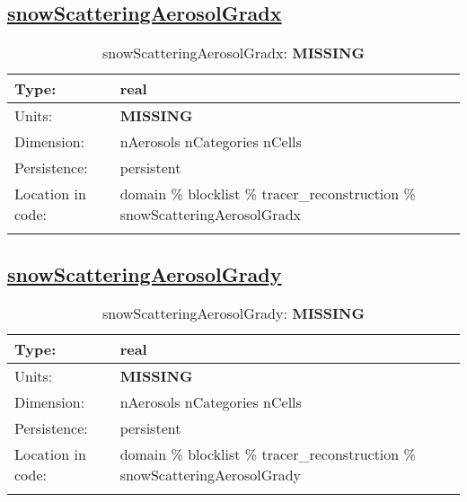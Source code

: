 \subsection[snowScatteringAerosolGradx]{\hyperref[sec:var_tab_tracer_reconstruction]{snowScatteringAerosolGradx}}
\label{subsec:var_sec_tracer_reconstruction_snowScatteringAerosolGradx}
\begin{center}
\begin{longtable}{| p{2.0in} | p{4.0in} |}
        \hline 
        Type: & real \\
        \hline 
        Units: & {\bf \color{red} MISSING} \\
        \hline 
        Dimension: & nAerosols nCategories nCells \\
        \hline 
        Persistence: & persistent \\
        \hline 
         Location in code: & domain \% blocklist \% tracer\_reconstruction \% snowScatteringAerosolGradx \\
         \hline 
    \caption{snowScatteringAerosolGradx: {\bf \color{red} MISSING}}
\end{longtable}
\end{center}
\subsection[snowScatteringAerosolGrady]{\hyperref[sec:var_tab_tracer_reconstruction]{snowScatteringAerosolGrady}}
\label{subsec:var_sec_tracer_reconstruction_snowScatteringAerosolGrady}
\begin{center}
\begin{longtable}{| p{2.0in} | p{4.0in} |}
        \hline 
        Type: & real \\
        \hline 
        Units: & {\bf \color{red} MISSING} \\
        \hline 
        Dimension: & nAerosols nCategories nCells \\
        \hline 
        Persistence: & persistent \\
        \hline 
         Location in code: & domain \% blocklist \% tracer\_reconstruction \% snowScatteringAerosolGrady \\
         \hline 
    \caption{snowScatteringAerosolGrady: {\bf \color{red} MISSING}}
\end{longtable}
\end{center}
